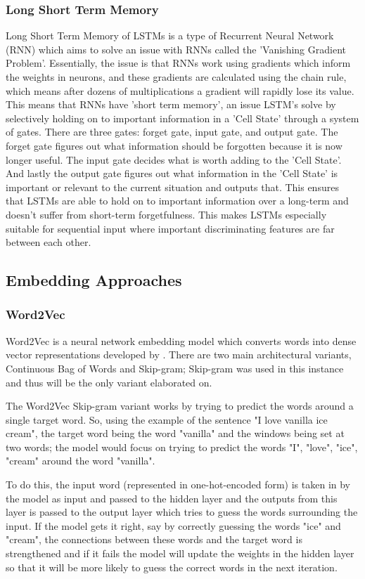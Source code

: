 \documentclass[stu,12pt,floatsintext,donotrepeattitle]{apa7}
\begin{document}
\subsubsection{Long Short Term Memory}
Long Short Term Memory of LSTMs is a type of Recurrent Neural Network (RNN) which aims to solve an issue with RNNs called the 'Vanishing Gradient Problem'. Essentially, the issue is that RNNs work using gradients which inform the weights in neurons, and these gradients are calculated using the chain rule, which means after dozens of multiplications a gradient will rapidly lose its value. This means that RNNs have 'short term memory', an issue LSTM's solve by selectively holding on to important information in a 'Cell State' through a system of gates. There are three gates: forget gate, input gate, and output gate. The forget gate figures out what information should be forgotten because it is now longer useful. The input gate decides what is worth adding to the 'Cell State'. And lastly the output gate figures out what information in the 'Cell State' is important or relevant to the current situation and outputs that. This ensures that LSTMs are able to hold on to important information over a long-term and doesn't suffer from short-term forgetfulness. This makes LSTMs especially suitable for sequential input where important discriminating features are far between each other. 

\subsection{Embedding Approaches}

\subsubsection{Word2Vec}
Word2Vec is a neural network embedding model which converts words into dense vector representations developed by \textcite{word2vec}. There are two main architectural variants, Continuous Bag of Words and Skip-gram; Skip-gram was used in this instance and thus will be the only variant elaborated on. 

The Word2Vec Skip-gram variant works by trying to predict the words around a single target word. So, using the example of the sentence "I love vanilla ice cream", the target word being the word "vanilla" and the windows being set at two words; the model would focus on trying to predict the words "I", "love", "ice", "cream" around the word "vanilla". 

To do this, the input word (represented in one-hot-encoded form) is taken in by the model as input and passed to the hidden layer and the outputs from this layer is passed to the output layer which tries to guess the words surrounding the input. If the model gets it right, say by correctly guessing the words "ice" and "cream", the connections between these words and the target word is strengthened and if it fails the model will update the weights in the hidden layer so that it will be more likely to guess the correct words in the next iteration.
\end{document}
